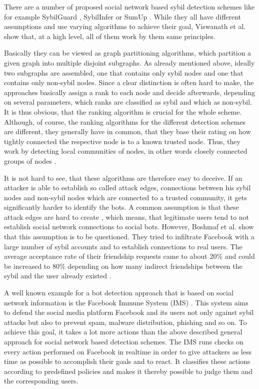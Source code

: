 There are a number of proposed social network based sybil detection schemes like for example SybilGuard \cite{sybilguard}, SybilInfer \cite{sybilinfer} or SumUp \cite{sumup}. While they all have different assumptions and use varying algorithms to achieve their goal, Viswanath et al. \cite{comparison} show that, at a high level, all of them work by them same principles.

Basically they can be viewed as graph partitioning algorithms, which partition a given graph into multiple disjoint subgraphs. As already mentioned above, ideally two subgraphs are assembled, one that contains only sybil nodes and one that contains only non-sybil nodes. Since a clear distinction is often hard to make, the approaches basically assign a rank to each node and decide afterwards, depending on several parameters, which ranks are classified as sybil and which as non-sybil. It is thus obvious, that the ranking algorithm is crucial for the whole scheme. Although, of course, the ranking algorithms for the different detection schemes are different, they generally have in common, that they base their rating on how tightly connected the respective node is to a known trusted node. Thus, they work by detecting local communities of nodes, in other words closely connected groups of nodes \cite{comparison}.

It is not hard to see, that these algorithms are therefore easy to deceive. If an attacker is able to establish so called attack edges, connections between his sybil nodes and non-sybil nodes which are connected to a trusted community, it gets significantly harder to identify the bots. A common assumption is that these attack edges are hard to create \cite{sybilguard}, which means, that legitimate users tend to not establish social network connections to social bots. However, Boshmaf et al. show \cite{boshmaf11} that this assumption is to be questioned. 
They tried to infiltrate Facebook with a large number of sybil accounts and to establish connections to real users. The average acceptance rate of their friendship requests came to about 20\% and could be increased to 80\% depending on how many indirect friendships between the sybil and the user already existed \cite{boshmaf11}.

A well known example for a bot detection approach that is based on social network information is the Facebook Immune System (IMS) \cite{fis}. This system aims to defend the social media platform Facebook and its users not only against sybil attacks but also to prevent spam, malware distribution, phishing and so on.  To achieve this goal, it takes a lot more actions than the above described general approach for social network based detection schemes. The IMS runs checks on every action performed on Facebook in realtime in order to give attackers as less time as possible to accomplish their goals and to react. It classifies these actions according to predefined policies and makes it thereby possible to judge them and the corresponding users.


